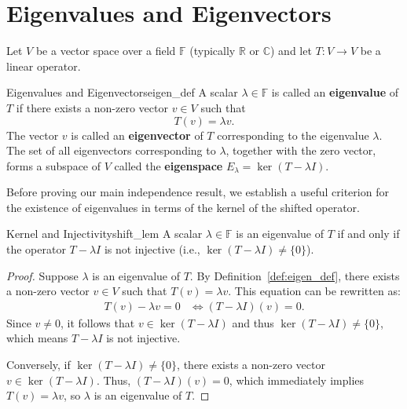 \section{Eigenvalues and Eigenvectors}
Let $V$ be a vector space over a field $\mathbb{F}$ (typically $\mathbb{R}$ or $\mathbb{C}$) and let $T: V \to V$ be a linear operator.

\begin{definition}{Eigenvalues and Eigenvectors}{eigen_def}
    A scalar $\lambda \in \mathbb{F}$ is called an \textbf{eigenvalue} of $T$ if there exists a non-zero vector $v \in V$ such that
    \begin{equation}
        T(v) = \lambda v.
    \end{equation}
    The vector $v$ is called an \textbf{eigenvector} of $T$ corresponding to the eigenvalue $\lambda$. The set of all eigenvectors corresponding to $\lambda$, together with the zero vector, forms a subspace of $V$ called the \textbf{eigenspace} $E_\lambda = \ker(T - \lambda I)$.
\end{definition}

Before proving our main independence result, we establish a useful criterion for the existence of eigenvalues in terms of the kernel of the shifted operator.

\begin{lemma}{Kernel and Injectivity}{shift_lem}
    A scalar $\lambda \in \mathbb{F}$ is an eigenvalue of $T$ if and only if the operator $T - \lambda I$ is not injective (i.e., $\ker(T - \lambda I) \neq \{0\}$).
\end{lemma}

\begin{proof}
    Suppose $\lambda$ is an eigenvalue of $T$. By Definition~\ref{def:eigen_def}, there exists a non-zero vector $v \in V$ such that $T(v) = \lambda v$. This equation can be rewritten as:
    \begin{align*}
        T(v) - \lambda v = 0 &\iff (T - \lambda I)(v) = 0.
    \end{align*}
    Since $v \neq 0$, it follows that $v \in \ker(T - \lambda I)$ and thus $\ker(T - \lambda I) \neq \{0\}$, which means $T - \lambda I$ is not injective.
    
    Conversely, if $\ker(T - \lambda I) \neq \{0\}$, there exists a non-zero vector $v \in \ker(T - \lambda I)$. Thus, $(T - \lambda I)(v) = 0$, which immediately implies $T(v) = \lambda v$, so $\lambda$ is an eigenvalue of $T$.
\end{proof}

